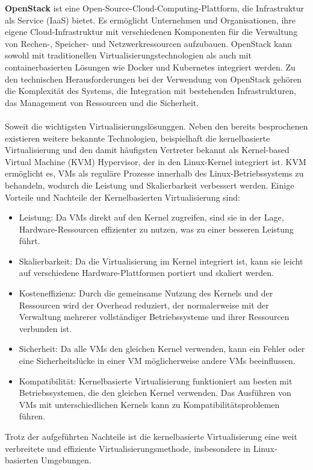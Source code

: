 \textbf{OpenStack} ist eine Open-Source-Cloud-Computing-Plattform, die Infrastruktur als Service (IaaS) bietet. Es ermöglicht Unternehmen und Organisationen, ihre eigene Cloud-Infrastruktur mit verschiedenen Komponenten für die Verwaltung von Rechen-, Speicher- und Netzwerkressourcen aufzubauen. OpenStack kann sowohl mit traditionellen Virtualisierungstechnologien als auch mit containerbasierten Lösungen wie Docker und Kubernetes integriert werden. Zu den technischen Herausforderungen bei der Verwendung von OpenStack gehören die Komplexität des Systems, die Integration mit bestehenden Infrastrukturen, das Management von Ressourcen und die Sicherheit.
\\\\
Soweit die wichtigsten Virtualisierungslösunggen. Neben den bereits besprochenen existieren weitere bekannte Technologien, beispielhaft die kernelbasierte Virtualisierung und den damit häufigsten Vertreter bekannt als Kernel-based Virtual Machine (KVM) Hypervisor, der in den Linux-Kernel integriert ist. KVM ermöglicht es, VMs als reguläre Prozesse innerhalb des Linux-Betriebssystems zu behandeln, wodurch die Leistung und Skalierbarkeit verbessert werden. Einige Vorteile und Nachteile der Kernelbasierten Virtualisierung sind:
\begin{itemize}
\item Leistung: Da VMs direkt auf den Kernel zugreifen, sind sie in der Lage, Hardware-Ressourcen effizienter zu nutzen, was zu einer besseren Leistung führt.
\item Skalierbarkeit: Da die Virtualisierung im Kernel integriert ist, kann sie leicht auf verschiedene Hardware-Plattformen portiert und skaliert werden.
\item Kosteneffizienz: Durch die gemeinsame Nutzung des Kernels und der Ressourcen wird der Overhead reduziert, der normalerweise mit der Verwaltung mehrerer vollständiger Betriebssysteme und ihrer Ressourcen verbunden ist.
\item Sicherheit: Da alle VMs den gleichen Kernel verwenden, kann ein Fehler oder eine Sicherheitslücke in einer VM möglicherweise andere VMs beeinflussen.
\item Kompatibilität: Kernelbasierte Virtualisierung funktioniert am besten mit Betriebssystemen, die den gleichen Kernel verwenden. Das Ausführen von VMs mit unterschiedlichen Kernels kann zu Kompatibilitätsproblemen führen.
\end{itemize}
Trotz der aufgeführten Nachteile ist die kernelbasierte Virtualisierung eine weit verbreitete und effiziente Virtualisierungsmethode, insbesondere in Linux-basierten Umgebungen.
